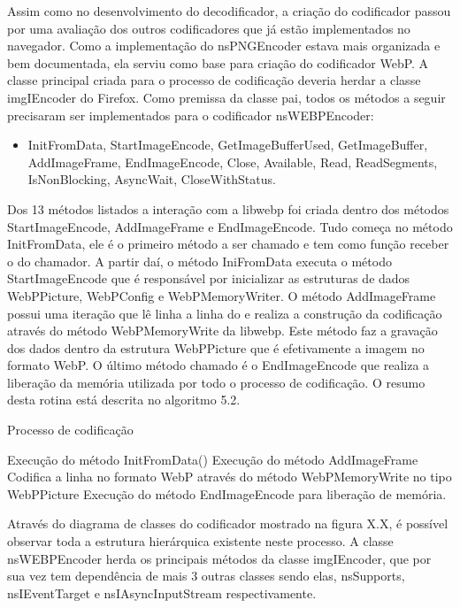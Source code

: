 \documentclass[espaco=simples,appendix=Name]{abnt}
\begin{document}
Assim como no desenvolvimento do decodificador, a criação do codificador passou por uma avaliação dos outros codificadores que já estão implementados no navegador. Como a implementação do nsPNGEncoder estava mais organizada e bem documentada, ela serviu como base para criação do codificador WebP. A classe principal criada para o processo de codificação deveria herdar a classe imgIEncoder do Firefox. Como premissa da classe pai, todos os métodos a seguir precisaram ser implementados para o codificador nsWEBPEncoder:

\begin{itemize}
	\item InitFromData, StartImageEncode, GetImageBufferUsed, GetImageBuffer, AddImageFrame, EndImageEncode, Close, Available, Read, ReadSegments, IsNonBlocking, AsyncWait, CloseWithStatus.
\end{itemize}

Dos 13 métodos listados a interação com a libwebp foi criada dentro dos métodos StartImageEncode, AddImageFrame e EndImageEncode. Tudo começa no método InitFromData, ele é o primeiro método a ser chamado e tem como função receber o  do chamador. A partir daí, o método IniFromData executa o método StartImageEncode que é responsável por inicializar as estruturas de dados WebPPicture, WebPConfig e WebPMemoryWriter. O método AddImageFrame possui uma iteração que lê linha a linha do  e realiza a construção da codificação através do método WebPMemoryWrite da libwebp. Este método faz a gravação dos dados dentro da estrutura WebPPicture que é efetivamente a imagem no formato WebP. O último método chamado é o EndImageEncode que realiza a liberação da memória utilizada por todo o processo de codificação. O resumo desta rotina está descrita no algoritmo 5.2.

\begin{algorithm}
\caption{Processo de codificação}
\label{Codificacao}
\begin{algorithmic}
        \STATE Execução do método InitFromData()
        \STATE Execução do método AddImageFrame
        \STATE Codifica a linha no formato WebP através do método WebPMemoryWrite no tipo WebPPicture
        \ENDFOR
        \STATE Execução do método EndImageEncode para liberação de memória.
\end{algorithmic}
\end{algorithm}

Através do diagrama de classes do codificador mostrado na figura X.X, é possível observar toda a estrutura hierárquica existente neste processo. A classe nsWEBPEncoder herda os principais métodos da classe imgIEncoder, que por sua vez tem dependência de mais 3 outras classes sendo elas, nsSupports, nsIEventTarget e nsIAsyncInputStream respectivamente.
\end{document}

